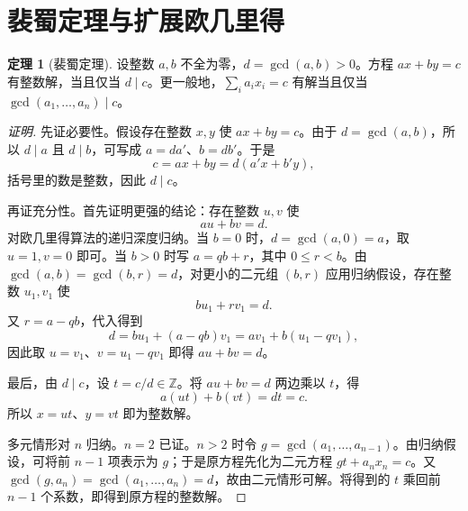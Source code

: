 \documentclass[UTF8,a4paper,11pt,twoside,openright,fontset=fandol]{ctexbook}
\theoremstyle{definition}
\newtheorem{theorem}[definition]{定理}
\begin{document}
\section{裴蜀定理与扩展欧几里得}
\begin{theorem}[裴蜀定理]
设整数 $a,b$ 不全为零，$d=\gcd(a,b)>0$。方程 $ax+by=c$ 有整数解，当且仅当 $d\mid c$。更一般地，$\sum_i a_ix_i=c$ 有解当且仅当 $\gcd(a_1,\ldots,a_n)\mid c$。
\end{theorem}

\begin{proof}[证明]
先证必要性。假设存在整数 $x,y$ 使 $ax+by=c$。由于 $d=\gcd(a,b)$，所以 $d\mid a$ 且 $d\mid b$，可写成 $a=da'$、$b=db'$。于是
\[
 c=ax+by=d(a'x+b'y),
\]
括号里的数是整数，因此 $d\mid c$。

再证充分性。首先证明更强的结论：存在整数 $u,v$ 使
\[
 au+bv=d.
\]
对欧几里得算法的递归深度归纳。当 $b=0$ 时，$d=\gcd(a,0)=a$，取 $u=1,v=0$ 即可。当 $b>0$ 时写 $a=qb+r$，其中 $0\le r<b$。由 $\gcd(a,b)=\gcd(b,r)=d$，对更小的二元组 $(b,r)$ 应用归纳假设，存在整数 $u_1,v_1$ 使
\[
 bu_1+rv_1=d.
\]
又 $r=a-qb$，代入得到
\[
 d=bu_1+(a-qb)v_1=av_1+b(u_1-qv_1),
\]
因此取 $u=v_1$、$v=u_1-qv_1$ 即得 $au+bv=d$。

最后，由 $d\mid c$，设 $t=c/d\in\mathbb Z$。将 $au+bv=d$ 两边乘以 $t$，得
\[
 a(ut)+b(vt)=dt=c.
\]
所以 $x=ut$、$y=vt$ 即为整数解。

多元情形对 $n$ 归纳。$n=2$ 已证。$n>2$ 时令 $g=\gcd(a_1,\ldots,a_{n-1})$。由归纳假设，可将前 $n-1$ 项表示为 $g$；于是原方程先化为二元方程 $gt+a_nx_n=c$。又 $\gcd(g,a_n)=\gcd(a_1,\ldots,a_n)=d$，故由二元情形可解。将得到的 $t$ 乘回前 $n-1$ 个系数，即得到原方程的整数解。
\end{proof}
\end{document}
